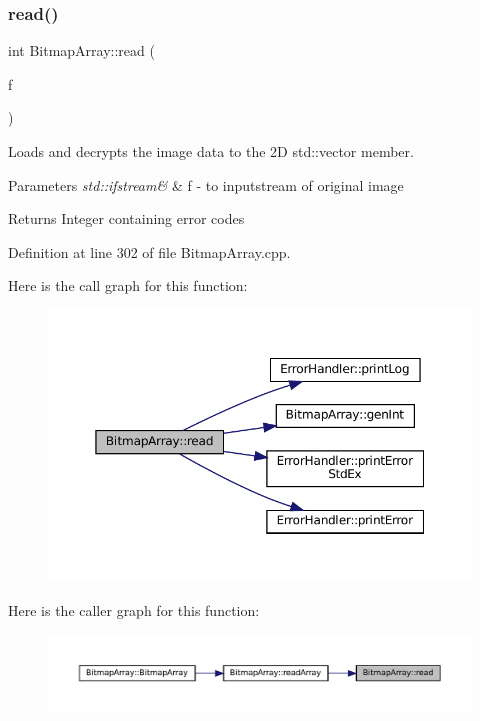 \subsubsection{\texorpdfstring{read()}{read()}}
{\footnotesize\ttfamily int Bitmap\+Array\+::read (\begin{DoxyParamCaption}\item[{std\+::ifstream \&}]{f }\end{DoxyParamCaption})\hspace{0.3cm}{\ttfamily [private]}}



Loads and decrypts the image data to the 2D std\+::vector member. 


\begin{DoxyParams}{Parameters}
{\em std\+::ifstream\&} & f -\/ to inputstream of original image \\
\hline
\end{DoxyParams}
\begin{DoxyReturn}{Returns}
Integer containing error codes 
\end{DoxyReturn}


Definition at line 302 of file Bitmap\+Array.\+cpp.

Here is the call graph for this function\+:
\nopagebreak
\begin{figure}[H]
\begin{center}
\leavevmode
\includegraphics[width=350pt]{classBitmapArray_a3a5834d03cd095769b422d4d66b9435f_cgraph}
\end{center}
\end{figure}
Here is the caller graph for this function\+:
\nopagebreak
\begin{figure}[H]
\begin{center}
\leavevmode
\includegraphics[width=350pt]{classBitmapArray_a3a5834d03cd095769b422d4d66b9435f_icgraph}
\end{center}
\end{figure}
\mbox{\label{classBitmapArray_a4ce4b5acc896040075be63a559799e7e}} 
